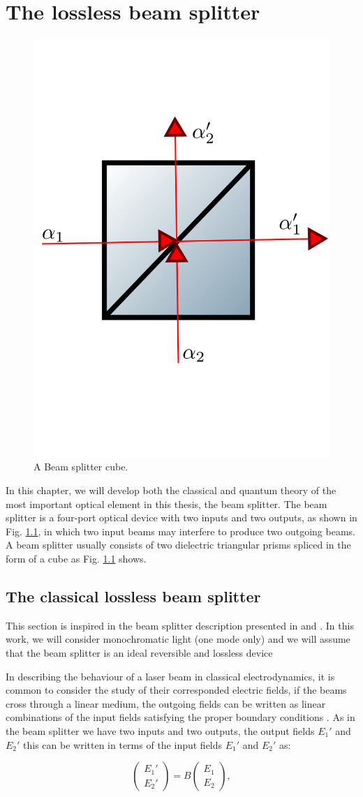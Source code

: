 \documentclass{book}
\begin{document}
\chapter{The lossless beam splitter}

\begin{figure}[h!]
\centering
\includegraphics[width=5 cm,height=5 cm]{images/bS.png}
\caption{A Beam splitter cube.}
\label{fig:BS}
\end{figure}

In this chapter, we will develop both the classical and quantum theory of the most important optical element in this thesis, the beam splitter. The beam splitter is a four-port optical device with two inputs and two outputs, as shown in Fig. \ref{fig:BS}, in which two input beams may interfere to produce two outgoing beams. A beam splitter usually consists of two dielectric triangular prisms spliced in the form of a cube as Fig. \ref{fig:BS} shows.

\section{The  classical lossless beam splitter}

This section is inspired in the beam splitter description presented in \cite{ludon} and \cite{leonhardt}. In this work, we will consider monochromatic light (one mode only) and we will assume that the beam splitter is an ideal reversible and lossless device


In describing the behaviour of a laser beam in classical electrodynamics, it is common to consider the study of their corresponded electric fields, if the beams cross through a linear medium, the outgoing fields can be written as linear combinations of the input fields satisfying the proper boundary conditions \cite{jackson}. As in the beam splitter we have two inputs and two outputs, the output fields $E_{1}'$ and $E_{2}'$ this can be written in terms of the input fields $E_{1}'$ and $E_{2}'$ as:

\begin{equation}
\begin{pmatrix} E_{1}' \\ E_{2}' \end{pmatrix}=B\begin{pmatrix} E_{1} \\ E_{2} \end{pmatrix},
\end{equation}
\end{document}
